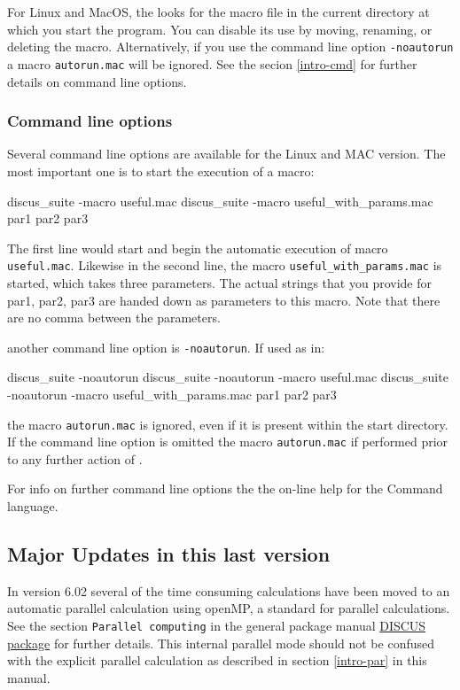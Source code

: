 For Linux and MacOS, the \Suite looks for the macro file
in the current directory at which you start the program. 
You can disable its use by moving, renaming, or deleting the
macro. Alternatively, if you use the command line option
{\tt -noautorun} a macro {\tt autorun.mac} will be ignored.
See the secion \ref{intro-cmd} for further details on command 
line options.

\subsubsection{Command line options \label{intro-cmd}}
Several command line options are available for the Linux  and
MAC version.
The most important one is to start the execution of a macro:

\begin{MacVerbatim}
discus_suite -macro useful.mac
discus_suite -macro useful_with_params.mac  par1 par2 par3
\end{MacVerbatim}

The first line would start \Suite and begin the automatic execution
of macro {\tt useful.mac}. Likewise in the second line, the macro
{\tt useful\_with\_params.mac} is started, which takes three parameters. 
The actual strings that
you provide for par1, par2, par3 are handed down as parameters to
this macro. Note that there are no comma between the parameters.

another command line option is {\tt -noautorun}. If used as in:
\begin{MacVerbatim}
discus_suite -noautorun
discus_suite -noautorun -macro useful.mac
discus_suite -noautorun -macro useful_with_params.mac  par1 par2 par3
\end{MacVerbatim}
the macro {\tt autorun.mac} is ignored, even if it is present 
within the start directory. If the command line option is 
omitted the macro {\tt autorun.mac} if performed prior to any
further action of \suite.

For info on further command line options the the on-line help for
the Command language.

\subsection{Major Updates in this last version}

In \Suite version 6.02 several of the time consuming calculations have
been moved to an automatic parallel calculation using openMP, a standard
for parallel calculations. See the section {\tt Parallel computing} in 
the general package manual 
\href{./package\_man.pdf}{DISCUS package} for further details. This internal
parallel mode should not be confused with the explicit parallel calculation as 
described in section \ref{intro-par} in this manual.
\\

